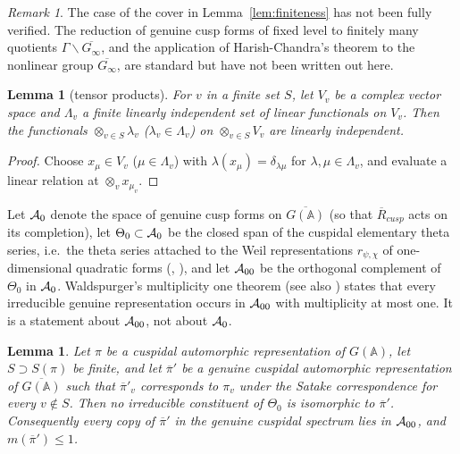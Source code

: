 \documentclass[12pt,letterpaper]{book}
\theoremstyle{plain}
\newtheorem{lemma}[theorem]{Lemma}
\theoremstyle{definition}
\theoremstyle{remark}
\theoremstyle{remark}
\newtheorem{remyy}{Remark}
\begin{document}
\begin{remyy}\label{rem26:finiteness-cover}
The case of the cover in Lemma~\ref{lem:finiteness} has not been fully
verified. The reduction of genuine cusp forms of fixed level to finitely
many quotients $\Gamma\backslash\overline{G_\infty}$, and the application of
Harish-Chandra's theorem to the nonlinear group $\overline{G_\infty}$, are
standard but have not been written out here.
\end{remyy}

\begin{lemma}[tensor products]\label{lem:tensor}
For $v$ in a finite set $S$, let $V_v$ be a complex vector space and
$\Lambda_v$ a finite linearly independent set of linear functionals on
$V_v$. Then the functionals $\otimes_{v\in S}\lambda_v$
($\lambda_v\in\Lambda_v$) on $\otimes_{v\in S}V_v$ are linearly
independent.
\end{lemma}

\begin{proof} Choose $x_{\mu}\in V_v$ ($\mu\in\Lambda_v$) with
$\lambda(x_\mu)=\delta_{\lambda\mu}$ for $\lambda,\mu\in\Lambda_v$, and
evaluate a linear relation at $\otimes_v x_{\mu_v}$.
\end{proof}

Let ${\cal A}_0$ denote the space of genuine cusp forms on
$\overline{G({\mathbb{A}})}$ (so that $\overline R_{cusp}$ acts on its
completion), let $\Theta_0\subset{\cal A}_0$ be the closed span of the
cuspidal elementary theta series, i.e.\ the theta series attached to the
Weil representations $r_{\psi,\chi}$ of one-dimensional quadratic forms
(\cite{GePS}, \cite{Ge2}), and let ${\cal A}_{00}$ be the orthogonal
complement of $\Theta_0$ in ${\cal A}_0$. Waldspurger's multiplicity one
theorem \cite{Wa1} (see also \cite{PS}) states that every irreducible
genuine representation occurs in ${\cal A}_{00}$ with multiplicity at
most one. It is a statement about ${\cal A}_{00}$, not about ${\cal A}_0$.

\begin{lemma}\label{lem:A00}
Let $\pi$ be a cuspidal automorphic representation of $G({\mathbb{A}})$,
let $S\supset S(\pi)$ be finite, and let $\overline{\pi}'$ be a genuine
cuspidal automorphic representation of $\overline{G({\mathbb{A}})}$ such
that $\overline{\pi}'_v$ corresponds to $\pi_v$ under the Satake
correspondence for every $v\notin S$. Then no irreducible constituent of
$\Theta_0$ is isomorphic to $\overline\pi'$. Consequently every copy of
$\overline\pi'$ in the genuine cuspidal spectrum lies in ${\cal A}_{00}$,
and $m(\overline{\pi}')\leq 1$.
\end{lemma}
\end{document}
